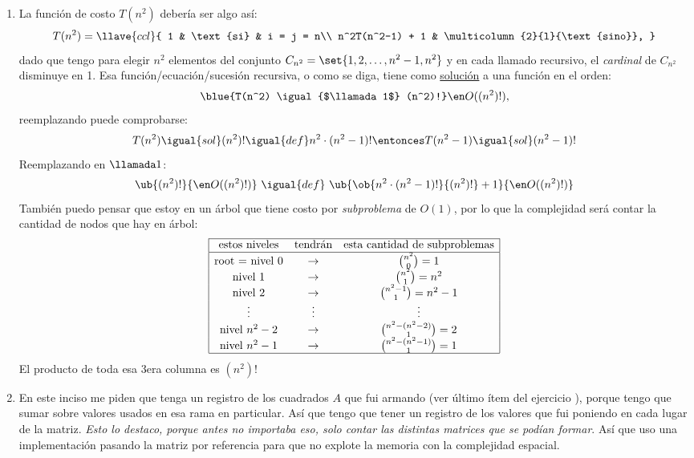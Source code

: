 \begin{enumerate}[label=$\alph*$)]
\item
La función de costo $T(n^2)$ debería ser algo así:
$$
  T(n^2) =
  \llave{ccl}{
    1 & \text{si} & i = j = n\\
    n^2T(n^2-1) + 1 & \multicolumn{2}{l}{\text{sino}},
  }
$$
dado que tengo para elegir $n^2$ elementos del conjunto $C_{n^2} = \set{1,2,\ldots,n^2-1, n^2}$ y en cada llamado recursivo,
el \textit{cardinal} de $C_{n^2}$ disminuye en 1. Esa función/ecuación/sucesión recursiva, o como se diga, tiene como \ul{solución} a una 
función en el orden:
$$
  \blue{T(n^2) \igual{$\llamada1$} (n^2)!} \en O((n^2)!),
$$
reemplazando puede comprobarse:
$$
  T(n^2) \igual{sol} (n^2)! \igual{def} n^2 \cdot (n^2 - 1)!
  \entonces
  T(n^2 - 1) \igual{sol} (n^2 - 1)!
$$
Reemplazando en $\llamada1$:
$$
  \ub{(n^2)!}{\en O((n^2)!)} ~ \igual{def} ~ \ub{\ob{n^2 \cdot (n^2 - 1)!}{(n^2)!} + 1}{\en O((n^2)!)}
$$
También puedo pensar que estoy en un árbol que tiene costo por \textit{subproblema} de $O(1)$, por lo que la complejidad será contar
la cantidad de nodos que hay en árbol:
$$
  \begin{array}{|ccc|}
    \cline{1-3}
    \text{estos niveles}  & \text{tendrán} & \text{esta cantidad de subproblemas} \\ \hline
    \text{root = nivel 0} & \to            & \binom{n^2}{0} = 1                   \\
    \text{nivel 1}        & \to            & \binom{n^2}{1} = n^2                 \\
    \text{nivel 2}        & \to            & \binom{n^2-1}{1} = n^2 - 1           \\
    \vdots                & \vdots         & \vdots                               \\
    \text{nivel } n^2-2   & \to            & \binom{n^2-(n^2 - 2)}{1} = 2         \\
    \text{nivel } n^2-1   & \to            & \binom{n^2-(n^2 - 1)}{1} = 1         \\ \hline
  \end{array}
$$
El producto de toda esa 3era columna es $(n^2)!$

\item En este inciso me piden que tenga un registro de los cuadrados $A$ que fui armando (ver último ítem del ejercicio ),
porque tengo que sumar sobre valores usados en esa rama en particular.
Así que tengo que tener un registro de los valores que fui poniendo en cada lugar de la matriz.
\textit{Esto lo destaco, porque antes no importaba eso, solo contar las distintas matrices que se podían formar}.
Así que uso una implementación pasando la matriz por referencia para que no explote la memoria con la complejidad espacial.


\end{enumerate}
